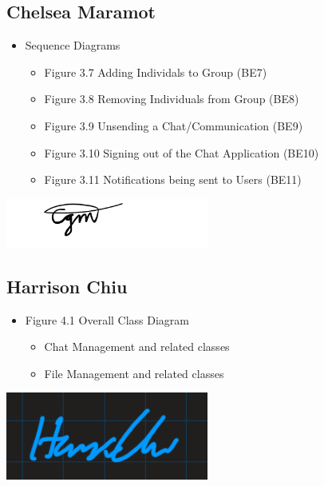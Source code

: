 \documentclass[]{article}
\begin{document}
\subsection{Chelsea Maramot}
\label{subsec:chelsea_maramot}
\begin{itemize}
	\item Sequence Diagrams
 		\begin{itemize}
   			\item Figure 3.7 Adding Individals to Group (BE7)
      			\item Figure 3.8 Removing Individuals from Group (BE8)
	 		\item Figure 3.9 Unsending a Chat/Communication (BE9)
    			\item Figure 3.10 Signing out of the Chat Application (BE10)
       			\item Figure 3.11 Notifications being sent to Users (BE11)
      		\end{itemize}
\end{itemize}
\includegraphics[width=0.5\textwidth]{chelsea.png}

\subsection{Harrison Chiu}
\label{subsec:harrison_chiu}
\begin{itemize}
	\item Figure 4.1 Overall Class Diagram
 		\begin{itemize}
   			\item Chat Management and related classes
      			\item File Management and related classes
	 	\end{itemize}
\end{itemize}
\includegraphics[width=0.5\textwidth]{harrison.png}
\end{document}
